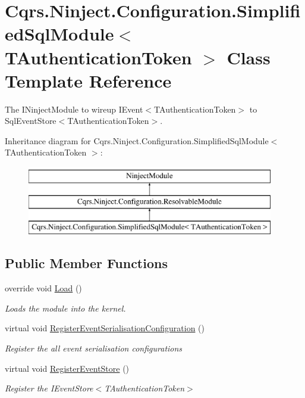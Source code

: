 \hypertarget{classCqrs_1_1Ninject_1_1Configuration_1_1SimplifiedSqlModule}{}\section{Cqrs.\+Ninject.\+Configuration.\+Simplified\+Sql\+Module$<$ T\+Authentication\+Token $>$ Class Template Reference}
\label{classCqrs_1_1Ninject_1_1Configuration_1_1SimplifiedSqlModule}


The I\+Ninject\+Module to wireup I\+Event$<$\+T\+Authentication\+Token$>$ to Sql\+Event\+Store$<$\+T\+Authentication\+Token$>$.  


Inheritance diagram for Cqrs.\+Ninject.\+Configuration.\+Simplified\+Sql\+Module$<$ T\+Authentication\+Token $>$\+:\begin{figure}[H]
\begin{center}
\leavevmode
\includegraphics[height=3.000000cm]{classCqrs_1_1Ninject_1_1Configuration_1_1SimplifiedSqlModule}
\end{center}
\end{figure}
\subsection*{Public Member Functions}
\begin{DoxyCompactItemize}
\item 
override void \hyperlink{classCqrs_1_1Ninject_1_1Configuration_1_1SimplifiedSqlModule_ab7d1313e9ab87ad752759e6acfcd2eb5_ab7d1313e9ab87ad752759e6acfcd2eb5}{Load} ()
\begin{DoxyCompactList}\small\item\em Loads the module into the kernel. \end{DoxyCompactList}\item 
virtual void \hyperlink{classCqrs_1_1Ninject_1_1Configuration_1_1SimplifiedSqlModule_ad4c66a055e431eb9502112291ea602e2_ad4c66a055e431eb9502112291ea602e2}{Register\+Event\+Serialisation\+Configuration} ()
\begin{DoxyCompactList}\small\item\em Register the all event serialisation configurations \end{DoxyCompactList}\item 
virtual void \hyperlink{classCqrs_1_1Ninject_1_1Configuration_1_1SimplifiedSqlModule_a56dec199f21a562dd6e0c4e2961a1858_a56dec199f21a562dd6e0c4e2961a1858}{Register\+Event\+Store} ()
\begin{DoxyCompactList}\small\item\em Register the I\+Event\+Store$<$\+T\+Authentication\+Token$>$ \end{DoxyCompactList}\end{DoxyCompactItemize}
